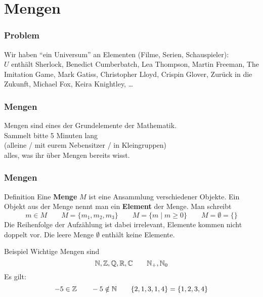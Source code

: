 \section{Mengen}


\begin{frame}
	\frametitle{Problem}
	Wir haben \enquote{ein Universum} an Elementen (Filme, Serien, Schauspieler):\\[0.5em]
	
	$U$ enthält Sherlock, Benedict Cumberbatch, Lea Thompson, Martin Freeman, The Imitation Game, Mark Gatiss, Christopher Lloyd, Crispin Glover, Zurück in die Zukunft, Michael Fox, Keira Knightley, \dots  
\end{frame}

\begin{frame}
	\frametitle{Mengen}
	Mengen sind eines der Grundelemente der Mathematik. \\[1em]
	Sammelt bitte 5 Minuten lang \\(alleine / mit eurem Nebensitzer / in Kleingruppen)\\ alles, was ihr über Mengen bereits wisst.
\end{frame}

\begin{frame}
	\frametitle{Mengen}

	\begin{block}{Definition}
		Eine \textbf{Menge} $M$ ist eine Ansammlung verschiedener Objekte. Ein Objekt aus der Menge nennt man ein \textbf{Element} der Menge. Man schreibt
		$$m \in M \qquad M = \{m_1, m_2, m_3 \} \qquad M = \{m \mid m \geq 0\} \qquad M = \emptyset = \{\} $$
		Die Reihenfolge der Aufzählung ist dabei irrelevant, Elemente kommen nicht doppelt vor. Die leere Menge $\emptyset$ enthält keine Elemente.
	\end{block}
	\pause
	
	\begin{block}{Beispiel}
		Wichtige Mengen sind
		$$\mathbb{N}, \mathbb{Z}, \mathbb{Q}, \mathbb{R}, \mathbb{C}\qquad \mathbb{N}_+, \mathbb{N}_0$$
		Es gilt: $$-5 \in \mathbb{Z}\qquad -5 \notin \mathbb{N}\qquad \{2, 1, 3, 1, 4\} = \{1, 2, 3, 4\}$$
	\end{block}
	
\end{frame}

